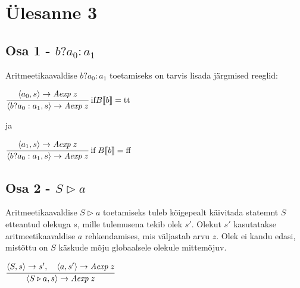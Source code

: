 \section{Ülesanne 3}
\subsection{Osa 1 - \(b?a_0:a_1\)}

Aritmeetikaavaldise \(b?a_0:a_1\) toetamiseks on tarvis lisada järgmised reeglid:

\(
\cfrac
  {\langle a_0,s \rangle \rightarrow \textit{Aexp} \; z}
  {\langle b?a_0:a_1,s \rangle  \rightarrow \textit{Aexp} \; z}
  \;
  \text{if}  B\llbracket b \rrbracket = \text{tt}
\)

ja

\(
\cfrac
  {\langle a_1,s \rangle \rightarrow \textit{Aexp} \; z}
  {\langle b?a_0:a_1,s \rangle  \rightarrow \textit{Aexp} \; z}
  \;
  \text{if} \; B\llbracket b \rrbracket = \text{ff}
\)

\subsection{Osa 2 - \(S \triangleright a \)}

Aritmeetikaavaldise \(S \triangleright a \) toetamiseks tuleb kõigepealt
käivitada statemnt \(S\) etteantud olekuga \(s\), mille tulemusena tekib olek
\(s'\).  Olekut \(s'\) kasutatakse aritmeetikaavaldise \(a\) rehkendamises, mis
väljastab arvu \(z\). Olek ei kandu edasi, mistõttu on \(S\) käskude mõju
globaalsele olekule mittemõjuv.

\vspace*{8pt}

\(
\cfrac
  {\langle S,s \rangle \rightarrow s', \quad \langle a, s' \rangle \rightarrow  \textit{Aexp} \; z}
  {\langle S \triangleright a,s \rangle  \rightarrow \textit{Aexp} \; z}
\)


